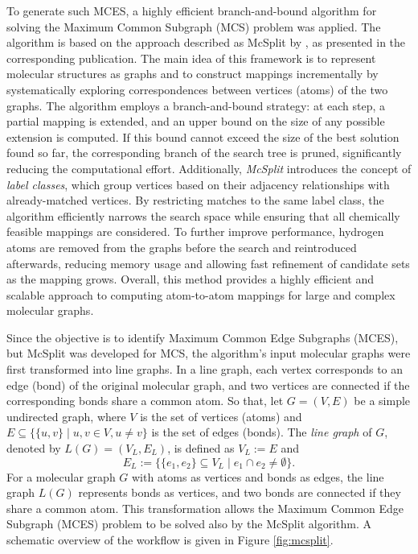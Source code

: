 \documentclass[a4paper,12pt]{article} %
\begin{document}
To generate such MCES, a highly efficient branch-and-bound algorithm for solving the Maximum Common Subgraph (MCS) problem was applied. The algorithm is based on the approach described as McSplit by \cite{McCreesh2017}, as presented in the corresponding publication. The main idea of this framework is to represent molecular structures as graphs and to construct mappings incrementally by systematically exploring correspondences between vertices (atoms) of the two graphs. The algorithm employs a branch-and-bound strategy: at each step, a partial mapping is extended, and an upper bound on the size of any possible extension is computed. If this bound cannot exceed the size of the best solution found so far, the corresponding branch of the search tree is pruned, significantly reducing the computational effort. Additionally, \emph{McSplit} introduces the concept of \emph{label classes}, which group vertices based on their adjacency relationships with already-matched vertices. By restricting matches to the same label class, the algorithm efficiently narrows the search space while ensuring that all chemically feasible mappings are considered. To further improve performance, hydrogen atoms are removed from the graphs before the search and reintroduced afterwards, reducing memory usage and allowing fast refinement of candidate sets as the mapping grows. Overall, this method provides a highly efficient and scalable approach to computing atom-to-atom mappings for large and complex molecular graphs.

Since the objective is to identify Maximum Common Edge Subgraphs (MCES), but McSplit was developed for MCS, the algorithm's input molecular graphs were first transformed into line graphs. In a line graph, each vertex corresponds to an edge (bond) of the original molecular graph, and two vertices are connected if the corresponding bonds share a common atom. So that, let $G = (V, E)$ be a simple undirected graph, where $V$ is the set of vertices (atoms) and $E \subseteq \{\{u,v\} \mid u,v \in V, u \neq v\}$ is the set of edges (bonds). The \emph{line graph} of $G$, denoted by $L(G) = (V_L, E_L)$, is defined as $V_L := E$ and \[E_L := \bigl\{ \{e_1, e_2\} \subseteq V_L \;\big|\; e_1 \cap e_2 \neq \emptyset \bigr\}.\] For a molecular graph $G$ with atoms as vertices and bonds as edges, the line graph $L(G)$ represents bonds as vertices, and two bonds are connected if they share a common atom. This transformation allows the Maximum Common Edge Subgraph (MCES) problem to be solved also by the McSplit algorithm. A schematic overview of the workflow is given in Figure \ref{fig:mcsplit}.
\end{document}

